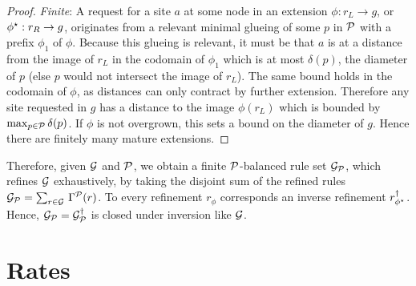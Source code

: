 \begin{proof}
  \emph{Finite}:
  A request for a site $a$ at some node in an extension
  $\phi: r_L\to g$, or $\phi^\star: r_R \to g$,
  originates from a relevant minimal glueing
  of some $p$ in $\mathcal{P}$ with a prefix $\phi_1$ of $\phi$.
  Because this glueing is relevant,
  it must be that $a$ is at a distance from the image of $r_L$
  in the codomain of $\phi_1$ which is at most $\delta(p)$,
  the diameter of $p$ (else $p$ would not intersect the image of $r_L$).
  The same bound holds in the codomain of $\phi$,
  as distances can only contract by further extension.
  Therefore any site requested in $g$
  has a distance to the image $\phi(r_L)$
  which is bounded by $\max_{p \in \mathcal{P}}\delta(p)$.
  If $\phi$ is not overgrown,
  this sets a bound on the diameter of $g$.
  Hence there are finitely many mature extensions.
\end{proof}

Therefore, given $\mathcal{G}$ and $\mathcal{P}$,
we obtain a finite $\mathcal{P}$-balanced rule set $\mathcal{G}_{\mathcal{P}}$,
which refines $\mathcal{G}$ exhaustively,
by taking the disjoint sum of the refined rules
$\mathcal{G}_{\mathcal{P}} = \sum_{r \in \mathcal{G}} \,\Gamma^{\mathcal{P}}(r)$.
To every refinement $r_\phi$ corresponds
an inverse refinement $r^\dagger_{\phi^\star}$.
Hence, $\mathcal{G}_{\mathcal{P}} = \mathcal{G}_{\mathcal{P}}^\dagger$
is closed under inversion like $\mathcal{G}$.


\section{Rates}
\label{sec:rates}

